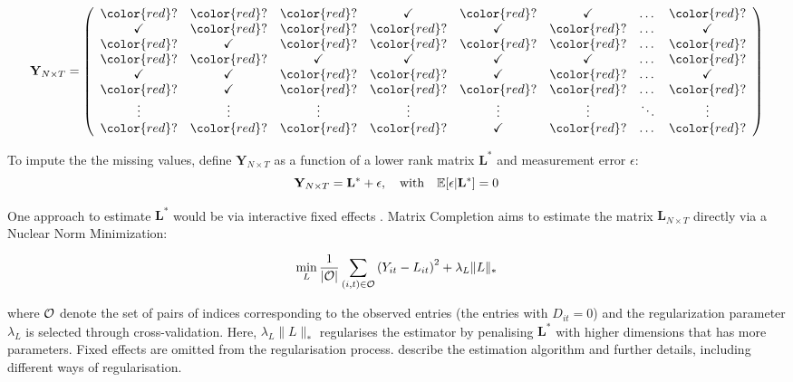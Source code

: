 $$
\mathbf Y_{N\times T}=\left(
\begin{array}{cccccccccc}
 {\color{red} ?} & {\color{red} ?} & {\color{red} ?} & \checkmark & {\color{red} ?}& \checkmark  & \dots  & {\color{red} ?}\\
\checkmark & {\color{red} ?} & {\color{red} ?} & {\color{red} ?} & \checkmark & {\color{red} ?}   & \dots & \checkmark  \\
{\color{red} ?}  & \checkmark & {\color{red} ?}  & {\color{red} ?} & {\color{red} ?} & {\color{red} ?} & \dots & {\color{red} ?}  \\
 {\color{red} ?} & {\color{red} ?} & \checkmark & \checkmark & \checkmark & \checkmark  & \dots  & {\color{red} ?}\\
\checkmark & \checkmark & {\color{red} ?} & {\color{red} ?} & \checkmark & {\color{red} ?}   & \dots & \checkmark  \\
{\color{red} ?}  & \checkmark & {\color{red} ?}  & {\color{red} ?} & {\color{red} ?} & {\color{red} ?} & \dots & {\color{red} ?}  \\
\vdots   &  \vdots & \vdots &\vdots   &  \vdots & \vdots &\ddots &\vdots \\
{\color{red} ?}  & {\color{red} ?} & {\color{red} ?} & {\color{red} ?}& \checkmark & {\color{red} ?}   & \dots & {\color{red} ?}\\
\end{array}
\right)
$$

To impute the the missing values, define $\mathbf Y_{N\times T}$ as a function of a lower rank matrix $\mathbf L^{*}$ and measurement error $\epsilon$:
\begin{equation}
\label{eq:mc}
\mathbf Y_{N\times T} = \mathbf L^{*} + \epsilon, \quad \rm{with} \quad  \mathbb{E}[\epsilon| \mathbf L^{*}] = 0
\end{equation}

One approach to estimate $\mathbf L^{*}$ would be via interactive fixed effects \cite{Xu.2017}. Matrix Completion \cite{Athey.2021} aims to estimate the matrix $\mathbf L_{N \times T}$ directly via a Nuclear Norm Minimization:

\begin{equation}
\label{eq:nuclear}
\min_{L}\frac{1}{|\cal{O}|}
\sum_{(i,t) \in \cal{O}} \left(Y_{it} -
L_{it} \right)^2+\lambda_L \|L\|_*
\end{equation}

\noindent where $\cal{O}$ denote the set of pairs of indices corresponding to the observed entries (the entries with $D_{it} = 0$) and the regularization parameter $\lambda_L$ is selected through cross-validation. Here, $\lambda_L \|L\|_*$ regularises the estimator by penalising $\mathbf L^{*}$ with higher dimensions that has more parameters. Fixed effects are omitted from the regularisation process. \textcite{Athey.2021} describe the estimation algorithm and further details, including different ways of regularisation.

